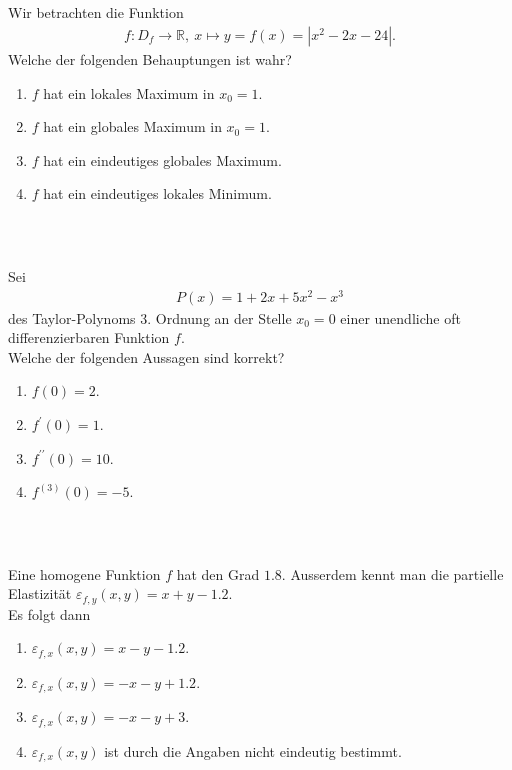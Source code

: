 \subsection*{}
Wir betrachten die Funktion
\begin{align*}
f : D_f \to \mathbb{R}, \ x \mapsto y = f(x) = | x^2 - 2x -24 |.
\end{align*}
Welche der folgenden Behauptungen ist wahr?
\renewcommand{\labelenumi}{(\alph{enumi})}
\begin{enumerate}
	\item 
	$ f $ hat ein lokales Maximum in $ x_0 = 1 $.
	\item
	$ f $ hat ein globales Maximum in $ x_0 = 1 $.
	\item
	$ f  $ hat ein eindeutiges globales Maximum.
	\item
	$ f $ hat ein eindeutiges lokales Minimum.
\end{enumerate}
\ \\
\subsection*{}
Sei 
\begin{align*}
P(x) = 1 + 2x + 5x^2 -x^3
\end{align*}
des Taylor-Polynoms 3. Ordnung an der Stelle $ x_0 = 0 $ einer unendliche oft differenzierbaren Funktion $ f $.\\
Welche der folgenden Aussagen sind korrekt?
\renewcommand{\labelenumi}{(\alph{enumi})}
\begin{enumerate}
	\item 
	$ f(0) = 2 $.
	\item
	$ f^\prime(0) = 1 $.
	\item
	$ f^{\prime \prime}(0) = 10 $.
	\item
	$ f^{(3)}(0) = -5 $.
\end{enumerate}
\ \\
\subsection*{}
Eine homogene Funktion $ f $ hat den Grad $ 1.8 $.
Ausserdem kennt man die partielle Elastizität
$ \varepsilon_{f,y}(x,y) = x +y -1.2 $.\\
Es folgt dann 
\renewcommand{\labelenumi}{(\alph{enumi})}
\begin{enumerate}
	\item 
	$ \varepsilon_{f,x}(x,y) = x-y -1.2 $.
	\item
	$ \varepsilon_{f,x}(x,y) = -x-y +1.2 $.
	\item
	$ \varepsilon_{f,x}(x,y) = -x-y +3 $.
	\item
	$ \varepsilon_{f,x}(x,y) $ ist durch die Angaben nicht eindeutig bestimmt.
\end{enumerate}

